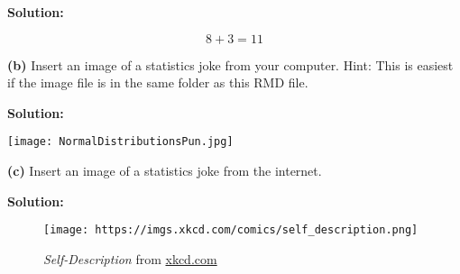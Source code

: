 \documentclass[
]{article}
\begin{document}
\textbf{Solution:}

\[ 8 + 3 = 11 \]

\textbf{(b)} Insert an image of a statistics joke from your computer.
Hint: This is easiest if the image file is in the same folder as this
RMD file.

\textbf{Solution:}

\texttt{[image: NormalDistributionsPun.jpg]}

\textbf{(c)} Insert an image of a statistics joke from the internet.

\textbf{Solution:}

\begin{figure}
\centering
\texttt{[image: https://imgs.xkcd.com/comics/self\_description.png]}
\caption{\emph{Self-Description} from
\href{https://xkcd.com/688/}{xkcd.com}}
\end{figure}
\end{document}
